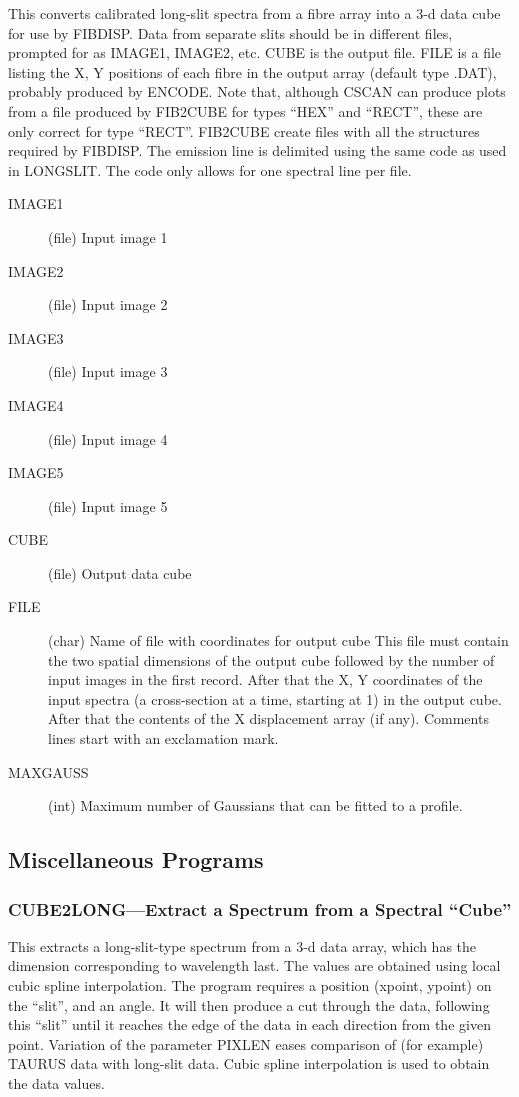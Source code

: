 \documentclass[11pt,twoside]{article}
\newcommand{\xlabel}[1]{}
\begin{document}
This converts calibrated long-slit spectra from a fibre array into a
3-d data cube for use by FIBDISP.
Data from separate slits should be in different files, prompted for as
IMAGE1, IMAGE2, etc.
CUBE is the output file.
FILE is a file listing the X, Y positions of each fibre in the output
array (default type .DAT), probably produced by ENCODE.
Note that, although CSCAN can produce plots from a file produced by
FIB2CUBE for types ``HEX'' and ``RECT'', these are only correct for type
``RECT''.
FIB2CUBE create files with all the structures required by FIBDISP.
The emission line is delimited using the same code as used in LONGSLIT.
The code only allows for one spectral line per file.
\begin{description}
\item[IMAGE1] (file) Input image 1
\item[IMAGE2] (file) Input image 2
\item[IMAGE3] (file) Input image 3
\item[IMAGE4] (file) Input image 4
\item[IMAGE5] (file) Input image 5
\item[CUBE] (file) Output data cube
\item[FILE] (char) Name of file with coordinates for output cube This
file must contain the two spatial dimensions of the output cube followed
by the number of input images in the
first record. After that the X, Y coordinates of the input spectra (a
cross-section at a time, starting at 1) in the output cube.
After that the contents of the X displacement array (if any).
Comments lines start with an exclamation mark.
\item[MAXGAUSS] (int) Maximum number of Gaussians that can be fitted
to a profile.
\end{description}

\subsection{\xlabel{miscellaneous_programs}\label{miscellaneous_programs}Miscellaneous Programs}

\subsubsection{\xlabel{cube2longextract_a_spectrum_from_a_spectral_cube}CUBE2LONG---Extract a Spectrum from a Spectral ``Cube''}

This extracts a long-slit-type spectrum from a 3-d data array, which
has the dimension corresponding to wavelength last. The values are
obtained using local cubic spline interpolation. The program requires
a position (xpoint, ypoint) on the ``slit'', and an angle. It will then
produce a cut through the data, following this ``slit'' until it reaches
the edge of the data in each direction from the given point. Variation
of the parameter PIXLEN eases comparison of (for example) TAURUS data
with long-slit data. Cubic spline interpolation is used to obtain the
data values.
\end{document}
